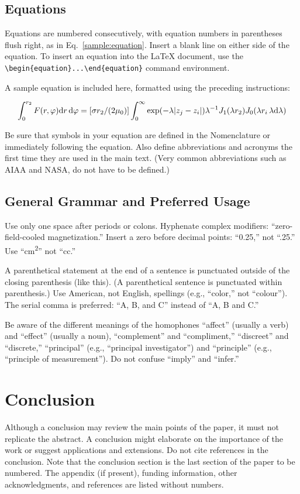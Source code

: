 \documentclass[journal ]{new-aiaa}
\begin{document}
\subsection{Equations}
Equations are numbered consecutively, with equation numbers in parentheses flush right, as in Eq.~\eqref{sample:equation}. Insert a blank line on either side of the equation. To insert an equation into the \LaTeX{} document, use the \verb|\begin{equation}...\end{equation}| command environment.

A sample equation is included here, formatted using the preceding instructions:

\begin{equation}
\label{sample:equation}
\int^{r_2}_0 F(r,\varphi){\rm d}r\,{\rm d}\varphi = [\sigma r_2/(2\mu_0)]\int^{\infty}_0\exp(-\lambda|z_j-z_i|)\lambda^{-1}J_1 (\lambda r_2)J_0 (\lambda r_i\,\lambda {\rm d}\lambda)
\end{equation}

Be sure that symbols in your equation are defined in the Nomenclature or immediately following the equation. Also define abbreviations and acronyms the first time they are used in the main text. (Very common abbreviations such as AIAA and NASA, do not have to be defined.)

\subsection{General Grammar and Preferred Usage}
Use only one space after periods or colons. Hyphenate complex modifiers: ``zero-field-cooled magnetization.'' Insert a zero before decimal points: ``0.25,'' not ``.25.'' Use ``\si{\centi\meter\squared}'' not ``cc.'' 

A parenthetical statement at the end of a sentence is punctuated outside of the closing parenthesis (like this). (A parenthetical sentence is punctuated within parenthesis.) Use American, not English, spellings (e.g., “color,” not “colour”). The serial comma is preferred: “A, B, and C” instead of “A, B and C.”

Be aware of the different meanings of the homophones “affect” (usually a verb) and “effect” (usually a noun), “complement” and “compliment,” “discreet” and “discrete,” “principal” (e.g., “principal investigator”) and “principle” (e.g., “principle of measurement”). Do not confuse “imply” and “infer.”

\section{Conclusion}
Although a conclusion may review the main points of the paper, it must not replicate the abstract. A conclusion might elaborate on the importance of the work or suggest applications and extensions. Do not cite references in the conclusion. Note that the conclusion section is the last section of the paper to be numbered. The appendix (if present), funding information, other acknowledgments, and references are listed without numbers.
\end{document}
